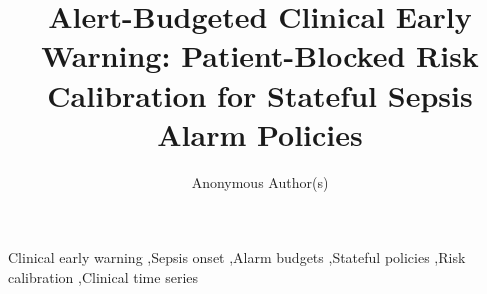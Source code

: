 \documentclass[5p,times]{elsarticle}
\begin{document}
\begin{frontmatter}

\title{Alert-Budgeted Clinical Early Warning: Patient-Blocked Risk Calibration for Stateful Sepsis Alarm Policies}

\author{Anonymous Author(s)}

\begin{abstract}

\end{abstract}

\begin{keyword}
Clinical early warning \sep Sepsis onset \sep Alarm budgets \sep Stateful policies \sep Risk calibration \sep Clinical time series
\end{keyword}

\end{frontmatter}







\FloatBarrier



\FloatBarrier


\FloatBarrier


\FloatBarrier
\begingroup
\small


\endgroup
\end{document}
